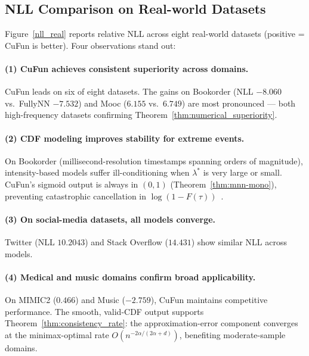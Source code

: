 \subsection{NLL Comparison on Real-world Datasets}

Figure~\ref{nll_real} reports relative NLL across eight real-world datasets
(positive = CuFun is better). Four observations stand out:

\paragraph{(1) CuFun achieves consistent superiority across domains.}
CuFun leads on six of eight datasets.
The gains on Bookorder (NLL $-8.060$ vs.\ FullyNN $-7.532$) and
Mooc ($6.155$ vs.\ $6.749$) are most pronounced — both high-frequency
datasets confirming Theorem~\ref{thm:numerical_superiority}.

\paragraph{(2) CDF modeling improves stability for extreme events.}
On Bookorder (millisecond-resolution timestamps spanning orders of
magnitude), intensity-based models suffer ill-conditioning when
$\lambda^*$ is very large or small.
CuFun's sigmoid output is always in $(0,1)$
(Theorem~\ref{thm:mnn-mono}), preventing catastrophic cancellation
in $\log(1-F(\tau))$~\cite{magdon1998neural}.

\paragraph{(3) On social-media datasets, all models converge.}
Twitter (NLL $10.2043$) and Stack Overflow ($14.431$) show similar NLL
across models.

\paragraph{(4) Medical and music domains confirm broad applicability.}
On MIMIC2 ($0.466$) and Music ($-2.759$), CuFun maintains competitive
performance. The smooth, valid-CDF output supports
Theorem~\ref{thm:consistency_rate}: the approximation-error component
converges at the minimax-optimal rate $O(n^{-2\alpha/(2\alpha+d)})$,
benefiting moderate-sample domains.

